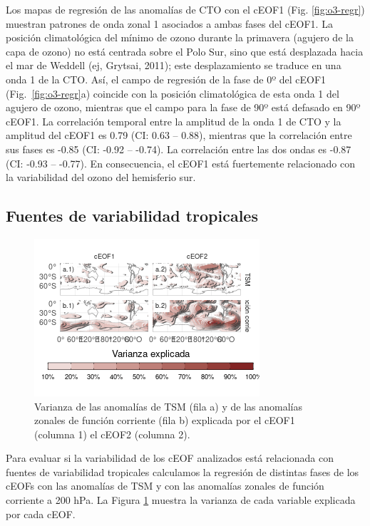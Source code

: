 \documentclass[12pt,oneside]{reedthesis}
\begin{document}
Los mapas de regresión de las anomalías de CTO con el cEOF1 (Fig. \ref{fig:o3-regr}) muestran patrones de onda zonal 1 asociados a ambas fases del cEOF1.
La posición climatológica del mínimo de ozono durante la primavera (agujero de la capa de ozono) no está centrada sobre el Polo Sur, sino que está desplazada hacia el mar de Weddell (ej, Grytsai, 2011); este desplazamiento se traduce en una onda 1 de la CTO.
Así, el campo de regresión de la fase de 0º del cEOF1 (Fig.~\ref{fig:o3-regr}a) coincide con la posición climatológica de esta onda 1 del agujero de ozono, mientras que el campo para la fase de 90º está defasado en 90º cEOF1.
La correlación temporal entre la amplitud de la onda 1 de CTO y la amplitud del cEOF1 es 0.79 (CI: 0.63 -- 0.88), mientras que la correlación entre sus fases es -0.85 (CI: -0.92 -- -0.74).
La correlación entre las dos ondas es -0.87 (CI: -0.93 -- -0.77).
En consecuencia, el cEOF1 está fuertemente relacionado con la variabilidad del ozono del hemisferio sur.

\hypertarget{fuentes-ceof}{%
\subsection{Fuentes de variabilidad tropicales}\label{fuentes-ceof}}



\begin{figure}
\includegraphics{figures/20-ceofs/psi-sst-explained-variance-1} \caption{Varianza de las anomalías de TSM (fila a) y de las anomalías zonales de función corriente (fila b) explicada por el cEOF1 (columna 1) el cEOF2 (columna 2).}\label{fig:psi-sst-explained-variance}
\end{figure}

Para evaluar si la variabilidad de los cEOF analizados está relacionada con fuentes de variabilidad tropicales calculamos la regresión de distintas fases de los cEOFs con las anomalías de TSM y con las anomalías zonales de función corriente a 200 hPa.
La Figura \ref{fig:psi-sst-explained-variance} muestra la varianza de cada variable explicada por cada cEOF.
\end{document}
